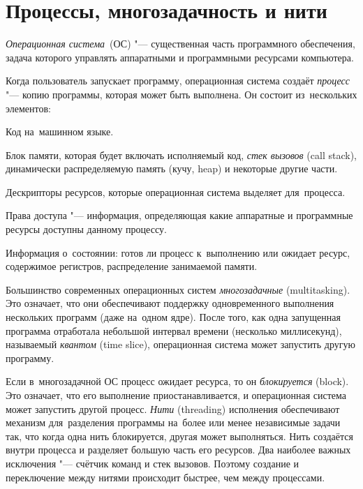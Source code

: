 \section{Процессы, многозадачность и нити}
\textit{Операционная система}~(ОС) "--- существенная часть программного обеспечения, задача которого управлять аппаратными и программными ресурсами компьютера.

Когда пользователь запускает программу, операционная система создаёт \textit{процесс} "--- копию программы, которая может быть выполнена. Он состоит из~нескольких элементов:
\begin{itemfeature}
  \item Код на~машинном языке.
  \item Блок памяти, которая будет включать исполняемый код, \textit{стек вызовов} (\textenglish{call stack}), динамически распределяемую память (кучу, \textenglish{heap}) и некоторые другие части.
  \item Дескрипторы ресурсов, которые операционная система выделяет для~процесса.
  \item Права доступа "--- информация, определяющая какие аппаратные и программные ресурсы доступны данному процессу.
  \item Информация о~состоянии: готов ли процесс к~выполнению или ожидает ресурс, содержимое регистров, распределение занимаемой памяти.
\end{itemfeature}

Большинство современных операционных систем \textit{многозадачные} (\textenglish{multitasking}). Это означает, что они обеспечивают поддержку одновременного выполнения нескольких программ (даже на~одном ядре). После того, как одна запущенная программа отработала небольшой интервал времени (несколько миллисекунд), называемый \textit{квантом} (\textenglish{time slice}), операционная система может запустить другую программу.

Если в~многозадачной ОС процесс ожидает ресурса, то он \textit{блокируется} (\textenglish{block}). Это означает, что его выполнение приостанавливается, и операционная система может запустить другой процесс. \textit{Нити} (\textenglish{threading}) исполнения обеспечивают механизм для~разделения программы на~более или менее независимые задачи так, что когда одна нить блокируется, другая может выполняться. Нить создаётся внутри процесса и разделяет большую часть его ресурсов. Два наиболее важных исключения "--- счётчик команд и стек вызовов. Поэтому создание и переключение между нитями происходит быстрее, чем между процессами.



